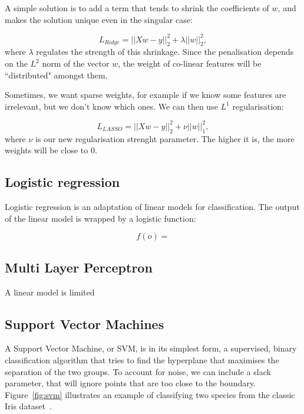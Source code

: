 A simple solution  is to add a term that tends to shrink the coefficients of $w$, and makes the solution unique even in the singular case:

\[ L_{Ridge} = || X w -y ||_2 ^2 + \lambda ||w||_2^2,\]
where $\lambda$ regulates the strength of this shrinkage.
Since the penalisation depends on the $L^2$ norm of the vector $w$, the weight of co-linear features will be ``distributed" amongst them.

Sometimes, we want sparse weights,  for example if we know some features are irrelevant, but we don't know which ones.
We can then use $L^1$ regularisation:

\[ L_{LASSO} = || X w -y ||_2 ^2 + \nu ||w||_1^2,\]
where $\nu$ is our new regularisation strenght parameter.
The higher it is, the more weights will be close to $0$.


\subsection{Logistic regression}
Logistic regression  is an adaptation of linear models for classification.
The output of the linear model is wrapped by a logistic function:

\[f(o) = \]

\subsection{Multi Layer Perceptron}
A linear model is limited

\subsection{Support Vector Machines}
A Support Vector Machine, or SVM, is in its simplest form, a supervised, binary classification algorithm that tries to find the hyperplane that maximises the separation of the two groups.
To account for noise, we can include a slack parameter, that will ignore points that are too close to the boundary.
Figure~\ref{fig:svm} illustrates an example of classifying two species from the classic Iris dataset~\citep{iris_dataset}.


